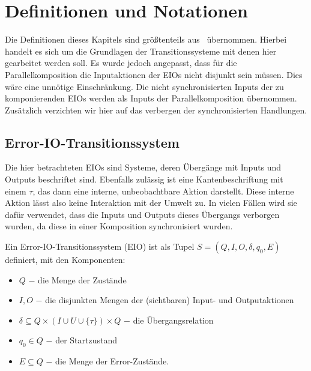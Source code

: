 \chapter{Definitionen und Notationen}

Die Definitionen dieses Kapitels sind größtenteils aus~\cite{Vogler2014EIO}
übernommen. Hierbei handelt es sich um die Grundlagen der Transitionssysteme mit denen
hier gearbeitet werden soll. Es wurde jedoch angepasst, dass für die
Parallelkomposition die Inputaktionen der EIOs nicht disjunkt sein müssen. Dies
wäre eine unnötige Einschränkung. Die nicht synchronisierten Inputs der zu komponierenden EIOs werden
als Inputs der Parallelkomposition übernommen. Zusätzlich verzichten wir hier
auf das verbergen der synchronisierten Handlungen.

\section{Error-IO-Transitionssystem}
Die hier betrachteten EIOs sind Systeme, deren Übergänge mit Inputs und Outputs
beschriftet sind. Ebenfalls zulässig ist eine Kantenbeschriftung mit einem
$\tau$, das dann eine interne, unbeobachtbare Aktion darstellt. Diese interne
Aktion lässt also keine Interaktion mit
der Umwelt zu. In vielen Fällen wird sie dafür verwendet, dass die Inputs und Outputs
dieses Übergangs verborgen wurden, da diese in einer Komposition synchronisiert
wurden.

\begin{Def}
  Ein Error-IO-Transitionssystem (EIO) ist
  als Tupel $S=(Q,I,O,\delta, q_0, E)$ definiert, mit den Komponenten:
  \begin{itemize}
    \item $Q$ $-$ die Menge der Zustände
    \item $I,O$ $-$ die disjunkten Mengen der (sichtbaren) Input- und Outputaktionen
    \item $\delta\subseteq Q\times (I\cup U\cup\{\tau\})\times Q$ $-$ die
      Übergangsrelation
    \item $q_0\in Q$ $-$ der Startzustand
    \item $E\subseteq Q$ $-$ die Menge der Error-Zustände.
  \end{itemize}
\end{Def}

